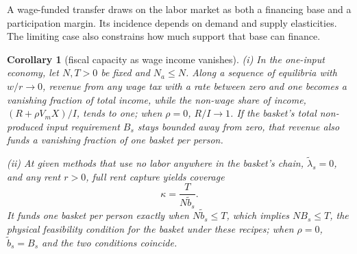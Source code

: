 \documentclass[12pt]{article}
\theoremstyle{plain}
\newtheorem{corollary}{Corollary}
\theoremstyle{definition}
\theoremstyle{remark}
\begin{document}
A wage-funded transfer draws on the labor market as both a financing base and a participation margin. Its incidence depends on demand and supply elasticities. The limiting case also constrains how much support that base can finance.

\begin{corollary}[fiscal capacity as wage income vanishes]\label{cor:fiscal}
(i) In the one-input economy, let $N,T>0$ be fixed and $N_a\le N$. Along a sequence of equilibria with $w/r\to0$, revenue from any wage tax with a rate between zero and one becomes a vanishing fraction of total income, while the non-wage share of income, $(R+\rho V_mX)/I$, tends to one; when $\rho=0$, $R/I\to1$. If the basket's total non-produced input requirement $B_s$ stays bounded away from zero, that revenue also funds a vanishing fraction of one basket per person.

(ii) At given methods that use no labor anywhere in the basket's chain, $\widetilde\lambda_s=0$, and any rent $r>0$, full rent capture yields coverage
\begin{equation}\label{eq:17}
\kappa=\frac{T}{N\widetilde b_s}.
\end{equation}
It funds one basket per person exactly when $N\widetilde b_s\le T$, which implies $NB_s\le T$, the physical feasibility condition for the basket under these recipes; when $\rho=0$, $\widetilde b_s=B_s$ and the two conditions coincide.
\end{corollary}
\end{document}
